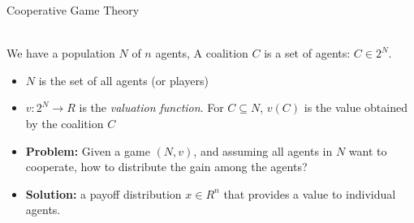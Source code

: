 \documentclass{beamer}
\begin{document}
\begin{frame}{Cooperative Game Theory}
    \begin{definition} [Coalition]~\\
       We have a population $N$ of $n$ agents, A coalition $C$ is a set of agents: $C \in 2^N$.
        \begin{itemize}
            \item $N$ is the set of all agents (or players)
            \item $v:2^N \rightarrow R$ is the \emph{valuation function}. For $C \subseteq N$, $v(C)$ is the value obtained by the coalition $C$
        \end{itemize}
    \end{definition}

    \begin{itemize}
        \item \textbf{Problem:} Given a game $(N,v)$, and assuming all agents in $N$ want to cooperate, how to distribute the gain among the agents?
        \item \textbf{Solution:} a payoff distribution $x \in R^n$ that provides a value to individual agents.


    \end{itemize}
\end{frame}
\end{document}
